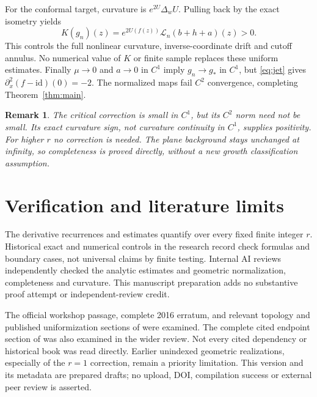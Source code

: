 \documentclass[11pt]{article}
\newtheorem{remark}{Remark}
\newcommand{\id}{\mathrm{id}}
\begin{document}
For the conformal target, curvature is $e^{2U}\Delta_w U$. Pulling back by the exact isometry yields
\[
 K(g_n)(z)=e^{2U(f(z))}\mathcal L_n(b+h+a)(z)>0.
\]
This controls the full nonlinear curvature, inverse-coordinate drift and cutoff annulus. No numerical value of $K$ or finite sample replaces these uniform estimates. Finally $\mu\to0$ and $a\to0$ in $C^1$ imply $g_n\to g_*$ in $C^1$, but \eqref{eq:jet} gives $\partial_x^2(f-\id)(0)=-2$. The normalized maps fail $C^2$ convergence, completing Theorem~\ref{thm:main}.

\begin{remark}
The critical correction is small in $C^1$, but its $C^2$ norm need not be small. Its exact curvature sign, not curvature continuity in $C^1$, supplies positivity. For higher $r$ no correction is needed. The plane background stays unchanged at infinity, so completeness is proved directly, without a new growth classification assumption.
\end{remark}

\section*{Verification and literature limits}
The derivative recurrences and estimates quantify over every fixed finite integer $r$. Historical exact and numerical controls in the research record check formulas and boundary cases, not universal claims by finite testing. Internal AI reviews independently checked the analytic estimates and geometric normalization, completeness and curvature. This manuscript preparation adds no substantive proof attempt or independent-review credit.

The official workshop passage, complete 2016 erratum, and relevant topology and published uniformization sections of \cite{BB18} were examined. The complete cited endpoint section of \cite{MSS22} was also examined in the wider review. Not every cited dependency or historical book was read directly. Earlier unindexed geometric realizations, especially of the $r=1$ correction, remain a priority limitation. This version and its metadata are prepared drafts; no upload, DOI, compilation success or external peer review is asserted.
\end{document}
